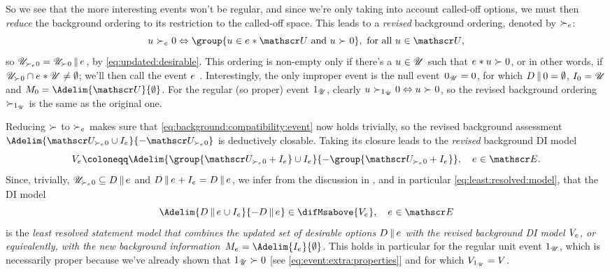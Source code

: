\documentclass[preprint]{isipta2025}
\begin{document}
So we see that the more interesting events won't be regular, and since we're only taking into account called-off options, we must then \emph{reduce} the background ordering to its restriction to the called-off space.
This leads to a \emph{revised} background ordering, denoted by \(\eventoptgt\):
\begin{equation}\label{eq:background:ordering:event}
\opt\eventoptgt0\ifandonlyif\group{\opt\in\calledoff{\opts}\text{ and }\opt\optgt0},
\text{ for all~\(\opt\in\opts\)},
\end{equation}
so \(\eventposopts=\posopts\altcondon\eventopt\), by \cref{eq:updated:desirable}.
This ordering is non-empty only if there's a \(\opt\in\opts\) such that \(\calledoff\opt\optgt0\), or in other words, if \(\posopts\cap\calledoff{\opts}\neq\emptyset\); we'll then call the event \(\eventopt\) .
Interestingly, the only improper event is the null event~\(\nulleventopt=0\), for which \(\desirset\altcondon0=\emptyset\), \(\indifset[0]=\opts\) and \(\M_0=\Adelim{\opts}{\emptyset}\).
For the regular (so proper) event \(\uniteventopt\), clearly \(\opt\optgt[\uniteventopt]0\ifandonlyif\opt\optgt0\), so the revised background ordering \(\optgt[\uniteventopt]\) is the same as the original one.

Reducing \(\optgt\) to \(\eventoptgt\) makes sure that \cref{eq:background:compatibility:event} now holds trivially, so the revised background assessment \(\Adelim{\eventposopts\cup\eventindifset}{-\eventposopts}\) is deductively closable.
Taking its closure leads to the \emph{revised} background DI model
\begin{equation}\label{eq:background:revised}
\eventbgM
\coloneqq\Adelim{\group{\eventposopts+\eventindifset}\cup\eventindifset}{-\group{\eventposopts+\eventindifset}},
\quad\eventopt\in\eventopts.
\end{equation}
Since, trivially, \(\eventposopts\subseteq\desirset\altcondon\eventopt\) and \(\desirset\altcondon\eventopt+\eventindifset=\desirset\altcondon\eventopt\), we infer from the discussion in , and in particular \cref{eq:least:resolved:model}, that the DI model
\begin{equation}\label{eq:desirability:indifference:revised}
\Adelim{\desirset\altcondon\eventopt\cup\eventindifset}{-\desirset\altcondon\eventopt}\in\difMsabove{\eventbgM},
\quad\eventopt\in\eventopts
\end{equation}
is the \emph{least resolved statement model that combines the updated set of desirable options \(\desirset\altcondon\eventopt\) with the revised background DI model \(\eventbgM\), or equivalently, with the new background information~\(\eventM=\Adelim{\eventindifset}{\emptyset}\).}
This holds in particular for the regular unit event \(\uniteventopt\), which is necessarily proper because we've already shown that \(\uniteventopt\optgt0\) [see \cref{eq:event:extra:properties}] and for which \(\bgM_{\uniteventopt}=\bgM\).
\end{document}
